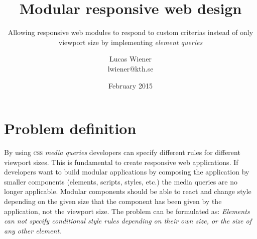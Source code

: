 \documentclass[oneside,a4paper,11pt]{kth-mag}
\title{Modular responsive web design}
\subtitle{Allowing responsive web modules to respond to custom criterias instead of only viewport size by implementing \emph{element queries}}
\author{Lucas Wiener \\ \lowercase{lwiener@kth.se}}
\date{February 2015}
\begin{document}
\frontmatter
\pagestyle{empty}
\removepagenumbers
\maketitle
\mainmatter
\section*{Problem definition}
By using \textsc{css} \emph{media queries} developers can specify different rules for different viewport sizes. This is fundamental to create responsive web applications. If developers want to build modular applications by composing the application by smaller components (elements, scripts, styles, etc.) the media queries are no longer applicable. Modular components should be able to react and change style depending on the given size that the component has been given by the application, not the viewport size. The problem can be formulated as: \emph{Elements can not specify conditional style rules depending on their own size, or the size of any other element}.
\end{document}
